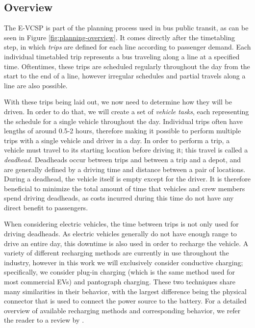 \documentclass[]{article}
\begin{document}
\subsection{Overview}
The E-VCSP is part of the planning process used in bus public transit, as can be seen in Figure \ref{fig:planning-overview}. It comes directly after the timetabling step, in which \emph{trips} are defined for each line according to passenger demand. Each individual timetabled trip represents a bus traveling along a line at a specified time. Oftentimes, these trips are scheduled regularly throughout the day from the start to the end of a line, however irregular schedules and partial travels along a line are also possible.

With these trips being laid out, we now need to determine how they will be driven. In order to do that, we will create a set of \emph{vehicle tasks}, each representing the schedule for a single vehicle throughout the day. Individual trips often have lengths of around 0.5-2 hours, therefore making it possible to perform multiple trips with a single vehicle and driver in a day. In order to perform a trip, a vehicle must travel to its starting location before driving it; this travel is called a \emph{deadhead}. Deadheads occur between trips and between a trip and a depot, and are generally defined by a driving time and distance between a pair of locations. During a deadhead, the vehicle itself is empty except for the driver. It is therefore beneficial to minimize the total amount of time that vehicles and crew members spend driving deadheads, as costs incurred during this time do not have any direct benefit to passengers.

When considering electric vehicles, the time between trips is not only used for driving deadheads. As electric vehicles generally do not have enough range to drive an entire day, this downtime is also used in order to recharge the vehicle. A variety of different recharging methods are currently in use throughout the industry, however in this work we will exclusively consider conductive charging; specifically, we consider plug-in charging (which is the same method used for most commercial EVs) and pantograph charging. These two techniques share many similarities in their behavior, with the largest difference being the physical connector that is used to connect the power source to the battery. For a detailed overview of available recharging methods and corresponding behavior, we refer the reader to a review by \citet{Zhou2024}.
\end{document}
